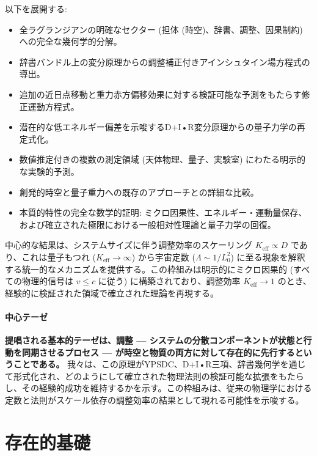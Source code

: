 \documentclass[11pt,a4paper]{article}
\begin{document}
	以下を展開する:
	\begin{itemize}
		\item 全ラグランジアンの明確なセクター (担体 (時空)、辞書、調整、因果制約) への完全な幾何学的分解。
		\item 辞書バンドル上の変分原理からの調整補正付きアインシュタイン場方程式の導出。
		\item 追加の近日点移動と重力赤方偏移効果に対する検証可能な予測をもたらす修正運動方程式。
		\item 潜在的な低エネルギー偏差を示唆するD+I•R変分原理からの量子力学の再定式化。
		\item 数値推定付きの複数の測定領域 (天体物理、量子、実験室) にわたる明示的な実験的予測。
		\item 創発的時空と量子重力への既存のアプローチとの詳細な比較。
		\item 本質的特性の完全な数学的証明: ミクロ因果性、エネルギー・運動量保存、および確立された極限における一般相対性理論と量子力学の回復。
	\end{itemize}
	
	中心的な結果は、システムサイズに伴う調整効率のスケーリング $K_{\mathrm{eff}} \propto D$ であり、これは量子もつれ ($K_{\mathrm{eff}} \to \infty$) から宇宙定数 ($\Lambda \sim 1/L_0^2$) に至る現象を解釈する統一的なメカニズムを提供する。この枠組みは明示的にミクロ因果的 (すべての物理的信号は $v \leq c$ に従う) に構築されており、調整効率 $K_{\mathrm{eff}} \to 1$ のとき、経験的に検証された領域で確立された理論を再現する。
	
	\paragraph{中心テーゼ}
	\textbf{提唱される基本的テーゼは、調整 — システムの分散コンポーネントが状態と行動を同期させるプロセス — が時空と物質の両方に対して存在的に先行するということである。} 我々は、この原理がYPSDC、D+I•R三項、辞書幾何学を通じて形式化され、どのようにして確立された物理法則の検証可能な拡張をもたらし、その経験的成功を維持するかを示す。この枠組みは、従来の物理学における定数と法則がスケール依存の調整効率の結果として現れる可能性を示唆する。
	
	\section{存在的基礎}
	\label{sec:ontological-foundations}
	
\end{document}
